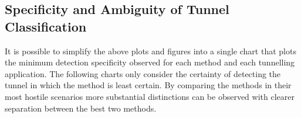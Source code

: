 \documentclass{llncs}
\begin{document}
\begin{figure}
\centering
{}
\end{figure}


\subsection{Specificity and Ambiguity of Tunnel Classification}
\label{detection-perf-cert}

It is possible to simplify the above plots and figures into a single chart that
plots the minimum detection specificity observed for each method and each
tunnelling application. The following charts only consider the certainty of
detecting the tunnel in which the method is least certain. By comparing the
methods in their most hostile scenarios more substantial distinctions can be
observed with clearer separation between the best two methods.
\end{document}
